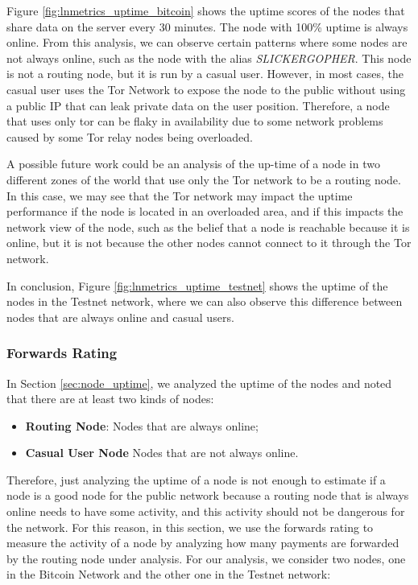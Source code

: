 Figure \ref{fig:lnmetrics_uptime_bitcoin} shows the uptime scores
of the nodes that share data on the server every 30 minutes.
The node with 100\% uptime is always online. From this analysis,
we can observe certain patterns where some nodes are not always
online, such as the node with the alias \emph{SLICKERGOPHER}.
This node is not a routing node, but it is run by a casual user.
However, in most cases, the casual user uses the Tor Network \cite{tor}
to expose the {\LN} node to the public without using a public IP
that can leak private data on the user position. Therefore, a node
that uses only tor can be flaky in availability due to some network
problems caused by some Tor relay nodes being overloaded.

A possible future work could be an analysis of the up-time of a node
in two different zones of the world that use only the Tor network to
be a routing node. In this case, we may see that the Tor network may
impact the uptime performance if the node is located in an overloaded
area, and if this impacts the network view of the node, such as the
belief that a node is reachable because it is online, but it is
not because the other nodes cannot connect to it through the Tor network.

In conclusion, Figure \ref{fig:lnmetrics_uptime_testnet} shows the uptime of
the nodes in the Testnet network, where we can also observe this
difference between nodes that are always online and casual users.

\subsubsection{Forwards Rating}
\label{sec:forwards_rating}

In Section \ref{sec:node_uptime}, we analyzed the uptime of the nodes 
and noted that there are at least two kinds of nodes:

\begin{itemize}
    \item {\bf Routing Node}: Nodes that are always online;
    \item {\bf Casual User Node} Nodes that are not always online.
\end{itemize}

Therefore, just analyzing the uptime of a node is not enough to estimate if a node is a 
good node for the public network because a routing node that is always online needs to 
have some activity, and this activity should not be dangerous for the network.
For this reason, in this section, we use the forwards rating to measure the activity of 
a node by analyzing how many payments are forwarded by the routing node under analysis. 
For our analysis, we consider two nodes, one in the Bitcoin Network and the other 
one in the Testnet network:

